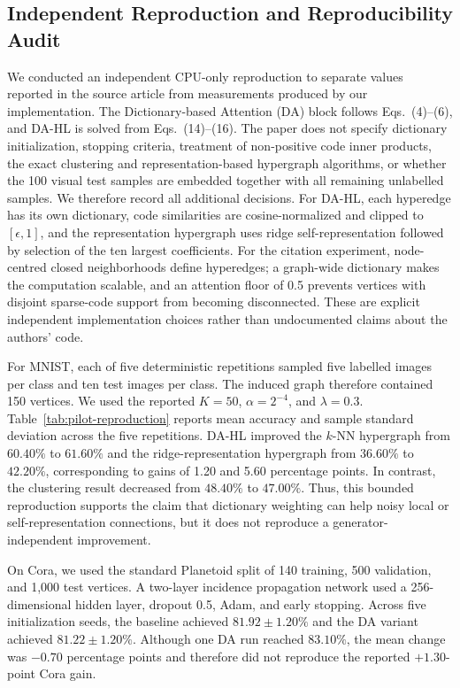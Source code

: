 \subsection{Independent Reproduction and Reproducibility Audit}
\label{sec:independent-reproduction}

We conducted an independent CPU-only reproduction to separate values reported
in the source article from measurements produced by our implementation.  The
Dictionary-based Attention (DA) block follows Eqs.~(4)--(6), and DA-HL is solved
from Eqs.~(14)--(16).  The paper does not specify dictionary initialization,
stopping criteria, treatment of non-positive code inner products, the exact
clustering and representation-based hypergraph algorithms, or whether the 100
visual test samples are embedded together with all remaining unlabelled
samples.  We therefore record all additional decisions.  For DA-HL, each
hyperedge has its own dictionary, code similarities are cosine-normalized and
clipped to $[\epsilon,1]$, and the representation hypergraph uses ridge
self-representation followed by selection of the ten largest coefficients. For
the citation experiment, node-centred closed neighborhoods define hyperedges;
a graph-wide dictionary makes the computation scalable, and an attention floor
of 0.5 prevents vertices with disjoint sparse-code support from becoming
disconnected. These are explicit independent implementation choices rather
than undocumented claims about the authors' code.

For MNIST, each of five deterministic repetitions sampled five labelled images
per class and ten test images per class.  The induced graph therefore contained
150 vertices.  We used the reported $K=50$, $\alpha=2^{-4}$, and
$\lambda=0.3$.  Table~\ref{tab:pilot-reproduction} reports mean accuracy and
sample standard deviation across the five repetitions.  DA-HL improved the
$k$-NN hypergraph from $60.40\%$ to $61.60\%$ and the ridge-representation
hypergraph from $36.60\%$ to $42.20\%$, corresponding to gains of 1.20 and 5.60
percentage points.  In contrast, the clustering result decreased from
$48.40\%$ to $47.00\%$.  Thus, this bounded reproduction supports the claim
that dictionary weighting can help noisy local or self-representation
connections, but it does not reproduce a generator-independent improvement.

On Cora, we used the standard Planetoid split of 140 training, 500 validation,
and 1,000 test vertices.  A two-layer incidence propagation network used a
256-dimensional hidden layer, dropout 0.5, Adam, and early stopping.  Across
five initialization seeds, the baseline achieved $81.92\pm1.20\%$ and the DA
variant achieved $81.22\pm1.20\%$.  Although one DA run reached $83.10\%$, the
mean change was $-0.70$ percentage points and therefore did not reproduce the
reported $+1.30$-point Cora gain.

